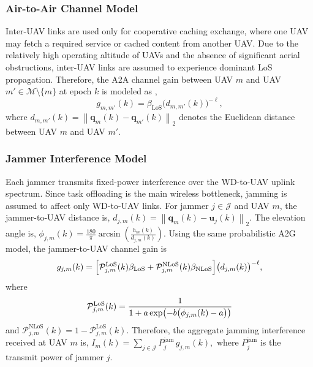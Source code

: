 \documentclass[journal]{IEEEtran}
\begin{document}
\subsubsection{Air-to-Air Channel Model}

Inter-UAV links are used only for cooperative caching exchange, where one
UAV may fetch a required service or cached content from another UAV. Due to the relatively high operating altitude of UAVs and the absence of significant aerial obstructions, inter-UAV links are assumed to
experience dominant LoS propagation. Therefore, the A2A channel gain between UAV $m$ and UAV $m'\in\mathcal{M}\setminus\{m\}$ at epoch $k$ is
modeled as \cite{8937764},
\begin{equation}
    g_{m,m'}(k)
    = \beta_{\mathrm{LoS}}
    \bigl(d_{m,m'}(k)\bigr)^{-\ell},
\label{eq:channel_gain_a2a}
\end{equation}
where $d_{m,m'}(k)
    = \left\|\mathbf{q}_m(k)-\mathbf{q}_{m'}(k)\right\|_2
\label{eq:dist_uav_uav}$ denotes the Euclidean distance between UAV $m$ and UAV $m'$.

\subsubsection{Jammer Interference Model}

Each jammer transmits fixed-power interference over the WD-to-UAV uplink spectrum. Since task offloading is the main wireless bottleneck, jamming is assumed to affect only WD-to-UAV links. For jammer $j\in\mathcal{J}$ and UAV $m$, the jammer-to-UAV distance is, $d_{j,m}(k)
    = \left\|\mathbf{q}_m(k)-\mathbf{u}_j(k)\right\|_2.
\label{eq:dist_jam_uav}$
The elevation angle is, $\phi_{j,m}(k)
    = \frac{180}{\pi}
    \arcsin\!\left(\frac{h_m(k)}{d_{j,m}(k)}\right).
\label{eq:elev_angle_jam}$
Using the same probabilistic A2G model, the jammer-to-UAV channel gain is
\begin{equation}
\small
    g_{j,m}(k)
    =
    \Bigl[
    \mathcal{P}^{\mathrm{LoS}}_{j,m}(k)\beta_{\mathrm{LoS}}
    + \mathcal{P}^{\mathrm{NLoS}}_{j,m}(k)\beta_{\mathrm{NLoS}}
    \Bigr]
    \bigl(d_{j,m}(k)\bigr)^{-\ell},
\label{eq:channel_gain_jam}
\end{equation}
where
\begin{equation}
\small
    \mathcal{P}^{\mathrm{LoS}}_{j,m}(k)
    = \frac{1}{1+a\exp\!\left(-b\bigl(\phi_{j,m}(k)-a\bigr)\right)}
\label{eq:los_prob_jam}
\end{equation}
and $\mathcal{P}^{\mathrm{NLoS}}_{j,m}(k)=1-\mathcal{P}^{\mathrm{LoS}}_{j,m}(k)$. Therefore, the aggregate jamming interference received at UAV $m$ is, $I_m(k)
    = \sum_{j\in\mathcal{J}} P_j^{\mathrm{jam}}\, g_{j,m}(k),
\label{eq:jam_agg}$
where $P_j^{\mathrm{jam}}$ is the transmit power of jammer $j$.
\end{document}
